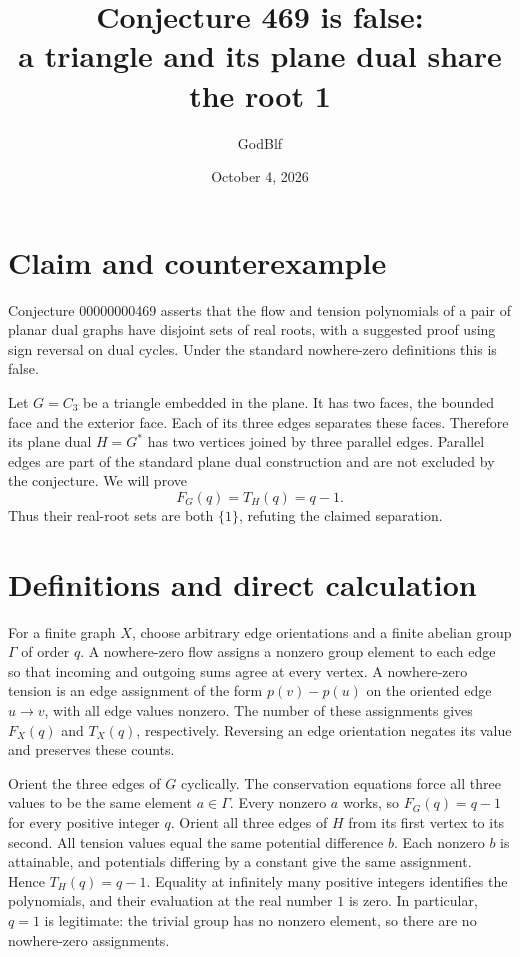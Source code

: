 \documentclass[11pt]{article}
\title{Conjecture 469 is false:\\a triangle and its plane dual share the root 1}
\author{GodBlf}
\date{October 4, 2026}
\begin{document}
\maketitle

\section{Claim and counterexample}
Conjecture 00000000469 asserts that the flow and tension polynomials of
a pair of planar dual graphs have disjoint sets of real roots, with a
suggested proof using sign reversal on dual cycles. Under the standard
nowhere-zero definitions this is false.

Let $G=C_3$ be a triangle embedded in the plane. It has two faces, the
bounded face and the exterior face. Each of its three edges separates
these faces. Therefore its plane dual $H=G^*$ has two vertices joined
by three parallel edges. Parallel edges are part of the standard plane
dual construction and are not excluded by the conjecture.
We will prove
\[
             F_G(q)=T_H(q)=q-1.
\]
Thus their real-root sets are both $\{1\}$, refuting the claimed separation.

\section{Definitions and direct calculation}
For a finite graph $X$, choose arbitrary edge orientations and a finite
abelian group $\Gamma$ of order $q$. A nowhere-zero flow assigns a nonzero
group element to each edge so that incoming and outgoing sums agree at
every vertex. A nowhere-zero tension is an edge assignment of the form
$p(v)-p(u)$ on the oriented edge $u\to v$, with all edge values nonzero.
The number of these assignments gives $F_X(q)$ and $T_X(q)$, respectively.
Reversing an edge orientation negates its value and preserves these counts.

Orient the three edges of $G$ cyclically. The conservation equations force
all three values to be the same element $a\in\Gamma$. Every nonzero $a$
works, so $F_G(q)=q-1$ for every positive integer $q$.
Orient all three edges of $H$ from its first vertex to its second.
All tension values equal the same potential difference $b$. Each nonzero
$b$ is attainable, and potentials differing by a constant give the same
assignment. Hence $T_H(q)=q-1$. Equality at infinitely many positive
integers identifies the polynomials, and their evaluation at the real
number $1$ is zero. In particular, $q=1$ is legitimate: the trivial group
has no nonzero element, so there are no nowhere-zero assignments.
\end{document}
